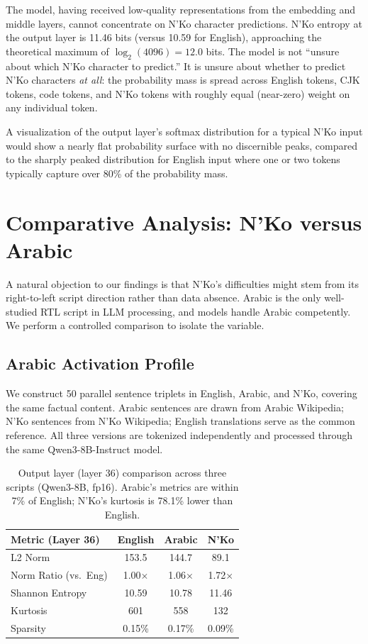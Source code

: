 \documentclass[11pt]{article}
\begin{document}
The model, having received low-quality representations from the embedding and middle layers, cannot concentrate on N'Ko character predictions.
N'Ko entropy at the output layer is 11.46 bits (versus 10.59 for English), approaching the theoretical maximum of $\log_2(4096) = 12.0$ bits.
The model is not ``unsure about which N'Ko character to predict.''
It is unsure about whether to predict N'Ko characters \emph{at all}: the probability mass is spread across English tokens, CJK tokens, code tokens, and N'Ko tokens with roughly equal (near-zero) weight on any individual token.

A visualization of the output layer's softmax distribution for a typical N'Ko input would show a nearly flat probability surface with no discernible peaks, compared to the sharply peaked distribution for English input where one or two tokens typically capture over 80\% of the probability mass.

\section{Comparative Analysis: N'Ko versus Arabic}
\label{sec:arabic-comparison}

A natural objection to our findings is that N'Ko's difficulties might stem from its right-to-left script direction rather than data absence.
Arabic is the only well-studied RTL script in LLM processing, and models handle Arabic competently.
We perform a controlled comparison to isolate the variable.

\subsection{Arabic Activation Profile}

We construct 50 parallel sentence triplets in English, Arabic, and N'Ko, covering the same factual content.
Arabic sentences are drawn from Arabic Wikipedia; N'Ko sentences from N'Ko Wikipedia; English translations serve as the common reference.
All three versions are tokenized independently and processed through the same Qwen3-8B-Instruct model.

\begin{table}[t]
\centering
\small
\begin{tabular}{lccc}
\toprule
\textbf{Metric (Layer 36)} & \textbf{English} & \textbf{Arabic} & \textbf{N'Ko} \\
\midrule
L2 Norm & 153.5 & 144.7 & 89.1 \\
Norm Ratio (vs.\ Eng) & 1.00$\times$ & 1.06$\times$ & 1.72$\times$ \\
Shannon Entropy & 10.59 & 10.78 & 11.46 \\
Kurtosis & 601 & 558 & 132 \\
Sparsity & 0.15\% & 0.17\% & 0.09\% \\
\bottomrule
\end{tabular}
\caption{Output layer (layer 36) comparison across three scripts (Qwen3-8B, fp16). Arabic's metrics are within 7\% of English; N'Ko's kurtosis is 78.1\% lower than English.}
\label{tab:arabic-comparison}
\end{table}
\end{document}
